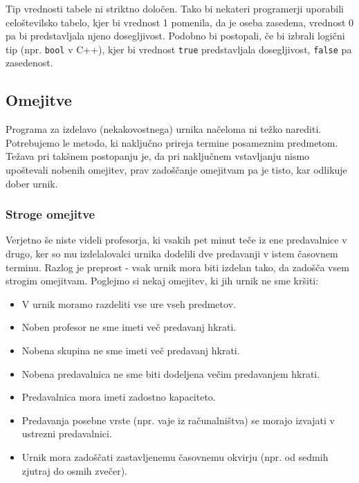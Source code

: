\documentclass[10pt,a4paper]{article}
\begin{document}
Tip vrednosti tabele ni striktno določen. Tako bi nekateri programerji uporabili
celoštevilsko tabelo, kjer bi vrednost 1 pomenila, da je oseba zasedena, vrednost 0
pa bi predstavljala njeno dosegljivost. Podobno bi postopali, če bi izbrali logični
tip (npr. \texttt{bool} v C++), kjer bi vrednost \texttt{true} predstavljala
dosegljivost, \texttt{false} pa zasedenost.

\subsection{Omejitve}

Programa za izdelavo (nekakovostnega) urnika načeloma ni težko narediti. Potrebujemo
le metodo, ki naključno prireja termine posameznim predmetom. Težava pri takšnem postopanju
je, da pri naključnem vstavljanju nismo upoštevali nobenih omejitev, prav zadoščanje omejitvam
pa je tisto, kar odlikuje dober urnik.

\subsubsection{Stroge omejitve}

Verjetno še niste videli profesorja, ki vsakih pet minut teče iz ene predavalnice v drugo,
ker so mu izdelalovalci urnika dodelili dve predavanji v istem časovnem terminu. Razlog
je preprost - vsak urnik mora biti izdelan tako, da zadošča vsem strogim omejitvam.
Poglejmo si nekaj omejitev, ki jih urnik ne sme kršiti:

\begin{itemize}
   \item V urnik moramo razdeliti vse ure vseh predmetov.
   \item Noben profesor ne sme imeti več predavanj hkrati.
   \item Nobena skupina ne sme imeti več predavanj hkrati.
   \item Nobena predavalnica ne sme biti dodeljena večim predavanjem hkrati.
   \item Predavalnica mora imeti zadostno kapaciteto.
   \item Predavanja posebne vrste (npr. vaje iz računalništva) se morajo izvajati v ustrezni predavalnici.
   \item Urnik mora zadoščati zastavljenemu časovnemu okvirju (npr. od sedmih zjutraj do osmih zvečer).
\end{itemize}
\end{document}
